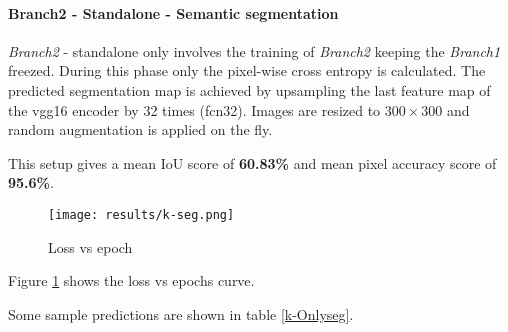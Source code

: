 \paragraph{Branch2 - Standalone - Semantic segmentation}

\textit{Branch2} - standalone only involves the training of \textit{Branch2} keeping the \textit{Branch1} freezed. During this phase only the pixel-wise cross entropy is calculated. The predicted segmentation map is achieved by upsampling the last feature map of the \ac{vgg}16 encoder by 32 times (\ac{fcn}32). Images are resized to $300\times300$ and random augmentation is applied on the fly.

\par

This setup gives a mean IoU score of \textbf{60.83\%} and mean pixel accuracy score of \textbf{95.6\%}. 

\begin{figure}[h!]
    \centering
    \texttt{[image: results/k-seg.png]}
    \caption{Loss vs epoch}
    \label{k-seg}
\end{figure}

Figure \ref{k-seg} shows the loss vs epochs curve. 

Some sample predictions are shown in table \ref{k-Onlyseg}.


